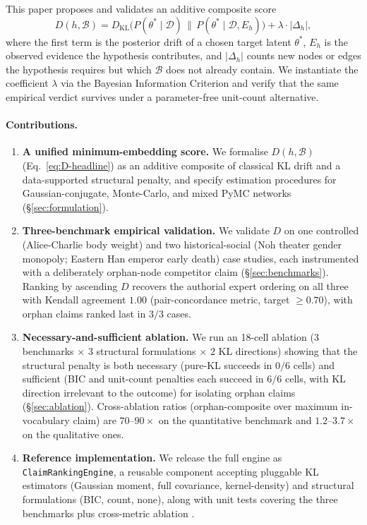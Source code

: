 \documentclass{article}
\begin{document}
This paper proposes and validates an additive composite score
\begin{equation}
\label{eq:D-headline}
D(h, \mathcal{B}) = D_{\mathrm{KL}}\big(P(\theta^{*} \mid \mathcal{D}) \,\big\|\,
P(\theta^{*} \mid \mathcal{D}, E_h)\big) + \lambda \cdot |\Delta_h|,
\end{equation}
where the first term is the posterior drift of a chosen target latent
$\theta^{*}$, $E_h$ is the observed evidence the hypothesis contributes,
and $|\Delta_h|$ counts new nodes or edges the hypothesis requires but
which $\mathcal{B}$ does not already contain. We instantiate the
coefficient $\lambda$ via the Bayesian Information Criterion
\citep{schwarz1978} and verify that the same empirical verdict survives
under a parameter-free unit-count alternative.

\paragraph{Contributions.}
\begin{enumerate}[leftmargin=*, itemsep=2pt]
\item \textbf{A unified minimum-embedding score.} We formalise
$D(h, \mathcal{B})$ (Eq.~\ref{eq:D-headline}) as an additive composite
of classical KL drift and a data-supported structural penalty, and
specify estimation procedures for Gaussian-conjugate, Monte-Carlo,
and mixed PyMC networks (\S\ref{sec:formulation}).

\item \textbf{Three-benchmark empirical validation.} We validate $D$
on one controlled (Alice-Charlie body weight) and two
historical-social (Noh theater gender monopoly; Eastern Han emperor
early death) case studies, each instrumented with a deliberately
orphan-node competitor claim (\S\ref{sec:benchmarks}). Ranking by
ascending $D$ recovers the authorial expert ordering on all three
with Kendall agreement $1.00$ (pair-concordance metric, target
$\geq 0.70$), with orphan claims ranked last in $3/3$ cases.

\item \textbf{Necessary-and-sufficient ablation.} We run an 18-cell
ablation ($3$ benchmarks $\times$ $3$ structural formulations $\times$
$2$ KL directions) showing that the structural penalty is both
necessary (pure-KL succeeds in $0/6$ cells) and sufficient (BIC and
unit-count penalties each succeed in $6/6$ cells, with KL direction
irrelevant to the outcome) for isolating orphan claims
(\S\ref{sec:ablation}). Cross-ablation ratios (orphan-composite over
maximum in-vocabulary claim) are $70$--$90\times$ on the quantitative
benchmark and $1.2$--$3.7\times$ on the qualitative ones.

\item \textbf{Reference implementation.} We release the full engine
as \texttt{ClaimRankingEngine}, a reusable component accepting
pluggable KL estimators (Gaussian moment, full covariance,
kernel-density) and structural formulations (BIC, count, none),
along with unit tests covering the three benchmarks plus
cross-metric ablation \citep{Anonymous2026MEIS}.
\end{enumerate}
\end{document}

